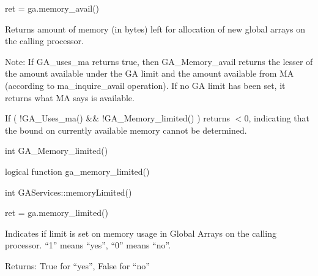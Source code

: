 \documentclass[12pt]{article}
\begin{document}
\begin{pyapi}
\begin{pycode}
ret = ga.memory_avail()
\end{pycode}
\end{pyapi}

\local

\begin{desc}

Returns amount of memory (in bytes) left for allocation of new global arrays on
the calling processor.

Note: If GA_uses_ma returns true, then GA_Memory_avail returns the lesser of
the amount available under the GA limit and the amount available from MA
(according to ma_inquire_avail operation). If no GA limit has been set, it
returns what MA says is available.

If ( !GA_Uses_ma() \&\& !GA_Memory_limited() ) returns $< 0$, indicating
that the bound on currently available memory cannot be determined.

\end{desc}


\begin{capi}
\begin{ccode}
int GA_Memory_limited()
\end{ccode}
\end{capi}

\begin{fapi}
\begin{fcode}
logical function ga_memory_limited()
\end{fcode}
\end{fapi}

\begin{cxxapi}
\begin{cxxcode}
int GAServices::memoryLimited()
\end{cxxcode}
\end{cxxapi}

\begin{pyapi}
\begin{pycode}
ret = ga.memory_limited()
\end{pycode}
\end{pyapi}

\local

\begin{desc}

Indicates if limit is set on memory usage in Global Arrays on the calling
processor.  ``1'' means ``yes'', ``0'' means ``no''.

Returns: True for ``yes'', False for ``no''

\end{desc}
\end{document}
